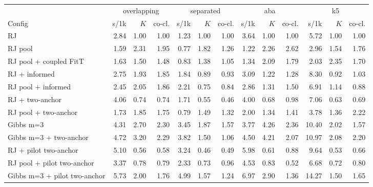 \begin{tabular}{l rrr rrr rrr rrr }
\toprule
 & \multicolumn{3}{c}{overlapping} & \multicolumn{3}{c}{separated} & \multicolumn{3}{c}{aba} & \multicolumn{3}{c}{k5} \\
Config & s/1k & $K$ & co-cl. & s/1k & $K$ & co-cl. & s/1k & $K$ & co-cl. & s/1k & $K$ & co-cl. \\
\midrule
RJ & 2.84 & 1.00 & 1.00 & 1.23 & 1.00 & 1.00 & 3.64 & 1.00 & 1.00 & 5.72 & 1.00 & 1.00 \\
RJ pool & 1.59 & 2.31 & 1.95 & 0.77 & 1.82 & 1.26 & 1.22 & 2.26 & 2.62 & 2.96 & 1.54 & 1.76 \\
RJ pool + coupled FitT & 1.63 & 1.50 & 1.48 & 0.83 & 1.38 & 1.05 & 1.34 & 2.09 & 1.79 & 2.03 & 2.35 & 1.70 \\
RJ + informed & 2.75 & 1.93 & 1.85 & 1.84 & 0.89 & 0.93 & 3.09 & 1.22 & 1.28 & 8.30 & 0.92 & 1.03 \\
RJ pool + informed & 2.45 & 2.05 & 1.86 & 2.21 & 0.75 & 0.84 & 2.86 & 1.31 & 1.50 & 6.91 & 1.14 & 0.88 \\
RJ + two-anchor & 4.06 & 0.74 & 0.74 & 1.71 & 0.55 & 0.46 & 4.00 & 0.68 & 0.98 & 7.06 & 0.63 & 0.69 \\
RJ pool + two-anchor & 1.73 & 1.85 & 1.75 & 0.79 & 1.49 & 1.32 & 2.00 & 1.34 & 1.41 & 3.78 & 1.36 & 2.22 \\
Gibbs m=3 & 4.31 & 2.70 & 2.30 & 3.45 & 1.87 & 1.57 & 3.77 & 4.26 & 2.36 & 10.40 & 2.02 & 1.57 \\
Gibbs m=3 + two-anchor & 4.72 & 3.20 & 2.29 & 3.82 & 1.50 & 1.06 & 4.50 & 4.21 & 2.07 & 10.97 & 2.08 & 2.20 \\
RJ + pilot two-anchor & 5.10 & 0.56 & 0.58 & 3.24 & 0.46 & 0.49 & 5.98 & 0.61 & 0.88 & 9.64 & 0.53 & 0.66 \\
RJ pool + pilot two-anchor & 3.37 & 0.78 & 0.79 & 2.33 & 0.73 & 0.96 & 4.53 & 0.83 & 0.52 & 6.68 & 0.72 & 0.80 \\
Gibbs m=3 + pilot two-anchor & 5.73 & 2.00 & 1.76 & 4.99 & 1.57 & 1.24 & 6.97 & 2.90 & 1.36 & 14.27 & 1.50 & 1.65 \\
\bottomrule
\end{tabular}
